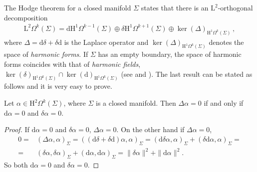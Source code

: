 The Hodge theorem for a closed manifold $\Sigma$ states that there is an $\mathrm{L}^2$-orthogonal decomposition
\begin{align}\label{Eqn: Hodge decomposition on closed manifolds}
	\mathrm{L}^2\Omega^k(\Sigma)=\mathrm{d} \mathrm{H}^1\Omega^{k-1}(\Sigma)\oplus\delta \mathrm{H}^1\Omega^{k+1}(\Sigma)\oplus{\ker(\Delta)_{\mathrm{H}^1\Omega^k(\Sigma)}}\,,
\end{align}
where $\Delta=\mathrm{d}\delta+\delta\mathrm{d}$ is the Laplace operator and $\ker(\Delta)_{\mathrm{H}^1\Omega^k(\Sigma)}$ denotes the space of \emph{harmonic forms}.
If $\Sigma$ has an empty boundary, the space of harmonic forms coincides with that of \emph{harmonic fields}, $\ker(\delta)_{\mathrm{H}^1\Omega^k(\Sigma)}\cap\ker(\mathrm{d})_{\mathrm{H}^1\Omega^k(\Sigma)}$ (see \parencite{Kodaira-49} and \parencite{Schwarz-95}).
The last result can be stated as follows and it is very easy to prove.
\begin{proposition}
	Let $\alpha\in\mathrm{H}^2\Omega^k(\Sigma)$, where $\Sigma$ is a closed manifold. Then $\Delta\alpha=0$ if and only if $\mathrm{d}\alpha=0$ and $\delta\alpha=0$.
\end{proposition}
\begin{proof}
	If $\mathrm{d}\alpha=0$ and $\delta\alpha=0$, $\Delta\alpha=0$. On the other hand if $\Delta\alpha=0$,
	\begin{align}
		0=&\left(\Delta\alpha,\alpha\right)_\Sigma=\left((\mathrm{d}\delta+\delta\mathrm{d})\alpha,\alpha\right)_\Sigma=\left(\mathrm{d}\delta\alpha,\alpha\right)_\Sigma+\left(\delta\mathrm{d}\alpha,\alpha\right)_\Sigma=\\
		=&\left(\delta\alpha,\delta\alpha\right)_\Sigma+\left(\mathrm{d}\alpha,\mathrm{d}\alpha\right)_\Sigma=\|\delta\alpha\|^2+\|\mathrm{d}\alpha\|^2.
	\end{align}
	So both $\mathrm{d}\alpha=0$ and $\delta\alpha=0$.
\end{proof}

